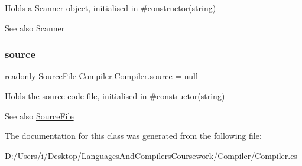 Holds a \mbox{\hyperlink{class_compiler_1_1_scanner}{Scanner}} object, initialised in \#constructor(string) \begin{DoxySeeAlso}{See also}
\mbox{\hyperlink{class_compiler_1_1_scanner}{Scanner}} 
\end{DoxySeeAlso}
\mbox{\label{class_compiler_1_1_compiler_a6096cba7dada5002eb07a626dc76cb89}} 
\subsubsection{\texorpdfstring{source}{source}}
{\footnotesize\ttfamily readonly \mbox{\hyperlink{class_compiler_1_1_source_file}{Source\+File}} Compiler.\+Compiler.\+source = null\hspace{0.3cm}{\ttfamily [private]}}

Holds the source code file, initialised in \#constructor(string) \begin{DoxySeeAlso}{See also}
\mbox{\hyperlink{class_compiler_1_1_source_file}{Source\+File}} 
\end{DoxySeeAlso}


The documentation for this class was generated from the following file\+:\begin{DoxyCompactItemize}
\item 
D\+:/\+Users/i/\+Desktop/\+Languages\+And\+Compilers\+Coursework/\+Compiler/\mbox{\hyperlink{_compiler_8cs}{Compiler.\+cs}}\end{DoxyCompactItemize}
